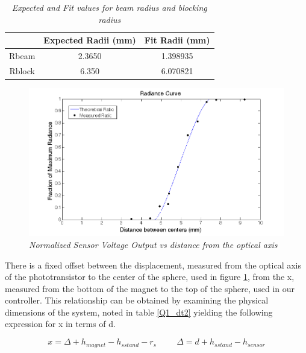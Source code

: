 \documentclass{article}
\theoremstyle{plain}
\theoremstyle{definition}
\theoremstyle{remark}
\begin{document}
\begin{table}
\begin{center}
    \begin{tabular}{|c|c|c|}
        \hline
        ~      & Expected Radii (mm) & Fit Radii (mm) \\ \hline
        Rbeam  & 2.3650              & 1.398935       \\ 
        Rblock & 6.350               & 6.070821       \\
        \hline
    \end{tabular}
\caption{\emph{Expected and Fit values for beam radius and blocking radius}}
\label{Q1_dt1}
\end{center}
\end{table}

\begin{figure}
\begin{center}
\includegraphics[width = 15cm]{SensorRadianceCurve.png}
\caption{\emph{Normalized Sensor Voltage Output vs distance from the optical axis}}
\label{Q1_d1}
\end{center}
\end{figure}

There is a fixed offset between the displacement, measured from the optical axis of the phototransistor to the center of the sphere, used in figure \ref{Q1_d1}, from the x, measured from the bottom of the magnet to the top of the sphere, used in our controller.  This relationship can be obtained by examining the physical dimensions of the system, noted in table \ref{Q1_dt2} yielding the following expression for x in terms of d.

$$ x = \Delta + h_{magnet} - h_{s stand} - r_{s} \hspace{1cm} \Delta = d + h_{s stand} - h_{sensor} $$
\end{document}
